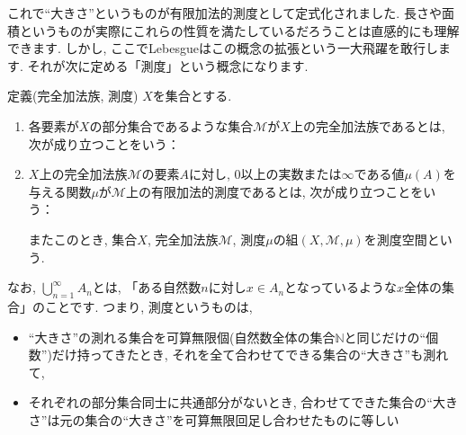 \par これで“大きさ”というものが有限加法的測度として定式化されました. 長さや面積というものが実際にこれらの性質を満たしているだろうことは直感的にも理解できます. しかし, ここでLebesgueはこの概念の拡張という一大飛躍を敢行します. それが次に定める「測度」という概念になります. 
\begin{itembox}[l]{定義(完全加法族, 測度)}
$X$を集合とする. 
\begin{enumerate}
\item 各要素が$X$の部分集合であるような集合$\mathcal{M}$が$X$上の完全加法族であるとは, 次が成り立つことをいう：
\item $X$上の完全加法族$\mathcal{M}$の要素$A$に対し, 0以上の実数または$\infty$である値$\mu(A)$を与える関数$\mu$が$\mathcal{M}$上の有限加法的測度であるとは, 次が成り立つことをいう：
またこのとき, 集合$X$, 完全加法族$\mathcal{M}$, 測度$\mu$の組$(X, \mathcal{M}, \mu)$を測度空間という. 
\end{enumerate}
\end{itembox}
\par  なお, $\displaystyle\bigcup_{n=1}^{\infty}A_{n}$とは, 「ある自然数$n$に対し$x\in A_{n}$となっているような$x$全体の集合」のことです. つまり, 測度というものは, 
\begin{itemize}
\item “大きさ”の測れる集合を可算無限個(自然数全体の集合$\mathbb{N}$と同じだけの“個数”)だけ持ってきたとき, それを全て合わせてできる集合の“大きさ”も測れて, 
\item それぞれの部分集合同士に共通部分がないとき, 合わせてできた集合の“大きさ”は元の集合の“大きさ”を可算無限回足し合わせたものに等しい
\end{itemize}
